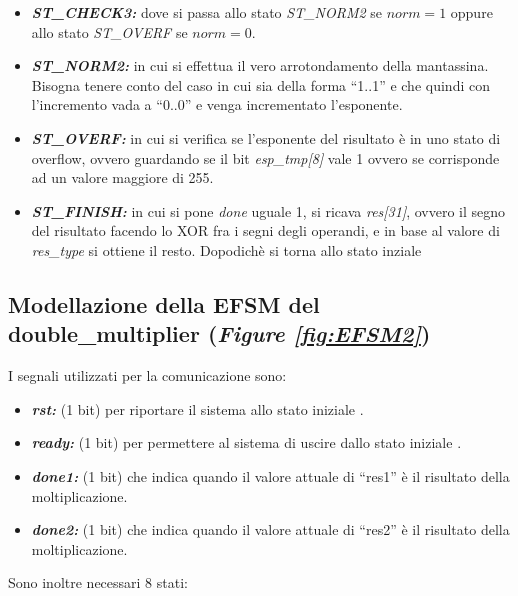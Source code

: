 \documentclass[]{IEEEtran}
\begin{document}
\begin{itemize}
    \item \textit{\textbf{ST\_CHECK3:}} dove si passa allo stato \textit{ST\_NORM2} se \(\textit{norm} = 1\) oppure allo stato \textit{ST\_OVERF} se \(\textit{norm} = 0\).
    \item \textit{\textbf{ST\_NORM2:}} in cui si effettua il vero arrotondamento della mantassina. Bisogna tenere conto del caso in cui sia della forma ``1..1'' e che quindi con l'incremento vada a ``0..0'' e  venga incrementato l'esponente.
    \item {\it\bf ST\_OVERF:} in cui si verifica se l'esponente del risultato è in uno stato di overflow, ovvero guardando se il bit {\it esp\_tmp[8]} vale 1 ovvero se corrisponde ad un valore maggiore di 255.
    \item {\it\bf ST\_FINISH:} in cui si pone {\it done} uguale 1, si ricava {\it res[31]}, ovvero il segno del risultato facendo lo XOR fra i segni degli operandi, e in base al valore di {\it res\_type} si ottiene il resto. Dopodichè si torna allo stato inziale
\end{itemize}


\subsection{Modellazione della EFSM del double\_multiplier ({\it Figure \ref{fig:EFSM2}})}
I segnali utilizzati per la comunicazione sono:
\begin{itemize}
    \item {\it\bf rst:} (1 bit) per riportare il sistema allo stato iniziale .
    \item {\it\bf ready:} (1 bit) per permettere al sistema di uscire dallo stato iniziale .
    \item {\it\bf done1:} (1 bit) che indica quando il valore attuale di ``res1'' è il risultato della moltiplicazione.
    \item {\it\bf done2:} (1 bit) che indica quando il valore attuale di ``res2'' è il risultato della moltiplicazione.
\end{itemize}

Sono inoltre necessari 8 stati:
\end{document}
